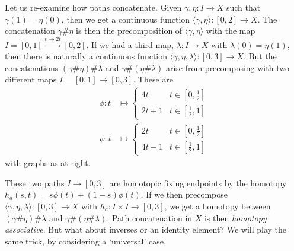 \documentclass{tufte-handout}
\theoremstyle{definition}
\begin{document}
Let us re-examine how paths concatenate. Given $\gamma,\eta\colon I \to X$ 
such that $\gamma(1) = \eta(0)$, then we get a continuous function 
$\langle\gamma,\eta\rangle\colon [0,2] \to X$. The concatenation $\gamma\#\eta$ is then 
the precomposition of $\langle\gamma, \eta\rangle$ with the map $I=[0,1] 
\xrightarrow{t\mapsto 2t} [0,2]$. If we had a third map, $\lambda\colon I\to X$ with 
$\lambda(0)=\eta(1)$, then there is naturally a continuous function $\langle\gamma, 
\eta,\lambda\rangle\colon [0,3]\to X$. But the concatenations $( \gamma \# \eta ) \# 
\lambda$ and $\gamma \# ( \eta \# \lambda)$ arise from precomposing with two different 
maps $I=[0,1]\to [0,3]$. These are
\begin{align*}
\phi\colon t& \mapsto \begin{cases}
4t & t\in [0,\frac12]\\
2t+1 & t\in [\frac12,1]
\end{cases}\\
\psi\colon t& \mapsto \begin{cases}
2t & t\in [0,\frac12]\\
4t-1 & t\in [\frac12,1]
\end{cases}
\end{align*}
with graphs as at right.

These two paths $I\to [0,3]$ are homotopic fixing endpoints by the homotopy $h_a(s,t) = 
s\phi(t) + (1-s) \phi(t)$. If we then precompose 
$\langle\gamma,\eta,\lambda\rangle\colon [0,3]\to X$ with $h_a\colon I\times I \to [0,3]$, 
we get a homotopy between $( \gamma \# \eta ) \# \lambda$ and $\gamma \# ( \eta 
\# \lambda)$. Path concatenation in $X$ is then \emph{homotopy associative}. But what 
about inverses or an identity element? We will play the same trick, by considering a 
`universal' case.
\end{document}
